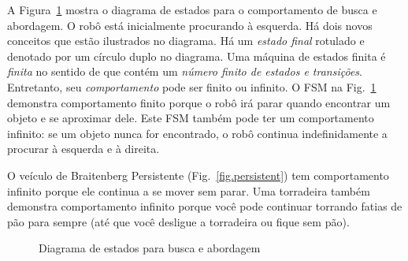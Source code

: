 A Figura~\ref{fig.search-approach} mostra o diagrama de estados para o comportamento de busca e abordagem. O robô está inicialmente procurando à esquerda. Há dois novos conceitos que estão ilustrados no diagrama. Há um \emph{estado final} rotulado  e denotado por um círculo duplo no diagrama. Uma máquina de estados finita é \emph{finita} no sentido de que contém um \emph{número finito de estados e transições}. Entretanto, seu \emph{comportamento} pode ser finito ou infinito. O FSM na Fig.~\ref{fig.search-approach} demonstra comportamento finito porque o robô irá parar quando encontrar um objeto e se aproximar dele. Este FSM também pode ter um comportamento infinito: se um objeto nunca for encontrado, o robô continua indefinidamente a procurar à esquerda e à direita.

O veículo de Braitenberg Persistente (Fig.~\ref{fig.persistent}) tem comportamento infinito porque ele continua a se mover sem parar. Uma torradeira também demonstra comportamento infinito porque você pode continuar torrando fatias de pão para sempre (até que você desligue a torradeira ou fique sem pão).

\begin{figure}
\begin{center}
\caption{Diagrama de estados para busca e abordagem}\label{fig.search-approach}
\end{center}
\end{figure}

